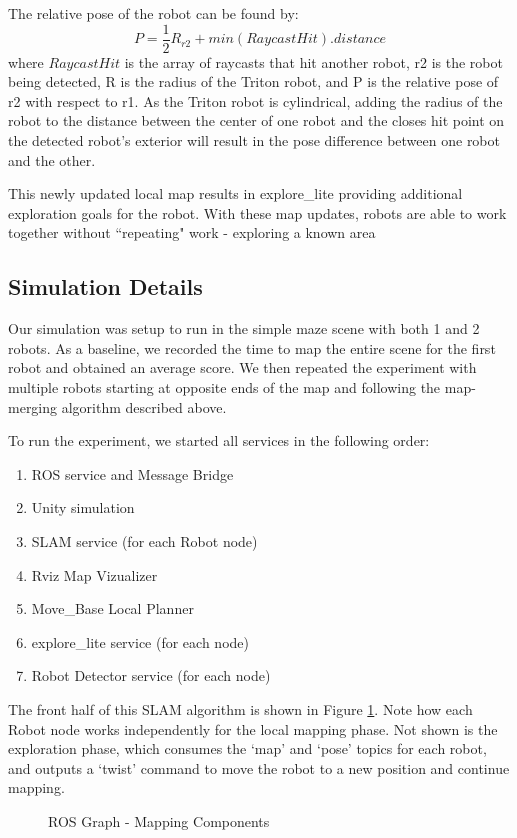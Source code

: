 \documentclass[11pt, conference]{IEEEtran}
\begin{document}
The relative pose of the robot can be found by:
\begin{equation}
P = \frac{1}{2}R_{r2} + min(RaycastHit).distance
\label{eq}
\end{equation}
where $RaycastHit$ is the array of raycasts that hit another robot, r2 is the robot being detected, R is the radius of the Triton robot, and P is the relative pose of r2 with respect to r1. As the Triton robot is cylindrical, adding the radius of the robot to the distance between the center of one robot and the closes hit point on the detected robot's exterior will result in the pose difference between one robot and the other. 

This newly updated local map results in explore\_lite providing additional exploration goals for the robot. With these map updates, robots are able to work together without ``repeating" work - exploring a known area


\subsection{Simulation Details}

Our simulation was setup to run in the simple maze scene with both 1 and 2 robots. As a baseline, we recorded the time to map the entire scene for the first robot and obtained an average score. We then repeated the experiment with multiple robots starting at opposite ends of the map and following the map-merging algorithm described above.

To run the experiment, we started all services in the following order:
\begin{enumerate}
    \item ROS service and Message Bridge
    \item Unity simulation
    \item SLAM service (for each Robot node)
    \item Rviz Map Vizualizer
    \item Move\_Base Local Planner
    \item explore\_lite service (for each node)
    \item Robot Detector service (for each node)
\end{enumerate}

The front half of this SLAM algorithm is shown in Figure \ref{fig:rosgraph_part}. 
Note how each Robot node works independently for the local mapping phase. Not shown is the exploration phase, which consumes the `map' and `pose' topics for each robot, and outputs a `twist' command to move the robot to a new position and continue mapping.  
\begin{figure}[hb]
\def\svgwidth{\columnwidth}

\caption{ROS Graph - Mapping Components}
\label{fig:rosgraph_part}
\end{figure}
\end{document}
